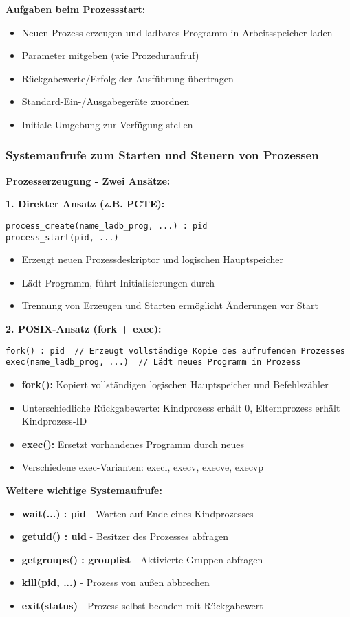 \documentclass[9pt,a4paper]{extarticle}
\begin{document}
\begin{multicols*}{2}
\textbf{Aufgaben beim Prozessstart:}
\begin{itemize}
\item Neuen Prozess erzeugen und ladbares Programm in Arbeitsspeicher laden
\item Parameter mitgeben (wie Prozeduraufruf)
\item Rückgabewerte/Erfolg der Ausführung übertragen
\item Standard-Ein-/Ausgabegeräte zuordnen
\item Initiale Umgebung zur Verfügung stellen
\end{itemize}

\subsubsection{Systemaufrufe zum Starten und Steuern von Prozessen}
\textbf{Prozesserzeugung - Zwei Ansätze:}

\textbf{1. Direkter Ansatz (z.B. PCTE):}
\begin{verbatim}
process_create(name_ladb_prog, ...) : pid
process_start(pid, ...)
\end{verbatim}
\begin{itemize}
\item Erzeugt neuen Prozessdeskriptor und logischen Hauptspeicher
\item Lädt Programm, führt Initialisierungen durch
\item Trennung von Erzeugen und Starten ermöglicht Änderungen vor Start
\end{itemize}

\textbf{2. POSIX-Ansatz (fork + exec):}
\begin{verbatim}
fork() : pid  // Erzeugt vollständige Kopie des aufrufenden Prozesses
exec(name_ladb_prog, ...)  // Lädt neues Programm in Prozess
\end{verbatim}
\begin{itemize}
\item \textbf{fork():} Kopiert vollständigen logischen Hauptspeicher und Befehlszähler
\item Unterschiedliche Rückgabewerte: Kindprozess erhält 0, Elternprozess erhält Kindprozess-ID
\item \textbf{exec():} Ersetzt vorhandenes Programm durch neues
\item Verschiedene exec-Varianten: execl, execv, execve, execvp
\end{itemize}

\textbf{Weitere wichtige Systemaufrufe:}
\begin{itemize}
\item \textbf{wait(...) : pid} - Warten auf Ende eines Kindprozesses
\item \textbf{getuid() : uid} - Besitzer des Prozesses abfragen
\item \textbf{getgroups() : grouplist} - Aktivierte Gruppen abfragen
\item \textbf{kill(pid, ...)} - Prozess von außen abbrechen
\item \textbf{exit(status)} - Prozess selbst beenden mit Rückgabewert
\end{itemize}


\end{multicols*}
\end{document}
